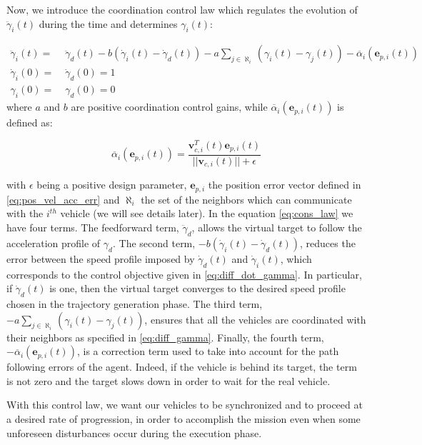 Now, we introduce the coordination control law which regulates the evolution of
$\ddot{\gamma}_i(t)$ during the time and determines $\gamma_i(t)$:

\begin{equation} \label{eq:cons_law}
  \begin{aligned}
    \ddot{\gamma}_i(t) = & \; \ddot{\gamma}_d(t) - b (\dot{\gamma}_i(t) - \dot{\gamma}_d(t)) - a \sum_{j \in \aleph_i} (\gamma_i(t) - \gamma_j(t)) - \overline{\alpha}_i (\bm{e}_{p,i}(t)) \\
    \dot{\gamma}_i(0) = & \; \dot{\gamma}_d(0) = 1 \\
    \gamma_i(0) = & \; \gamma_d(0) = 0
  \end{aligned}
\end{equation}
where $a$ and $b$ are positive coordination control gains, while $\overline{\alpha}_i (\bm{e}_{p,i}(t))$
is defined as:

\begin{equation} \label{eq:error_term}
  \overline{\alpha}_i (\bm{e}_{p,i}(t)) = \frac{\bm{v}_{c,i}^T(t) \bm{e}_{p,i}(t)}{||\bm{v}_{c,i}(t)|| + \epsilon}
\end{equation}

with $\epsilon$ being a positive design parameter, $\bm{e}_{p,i}$ the position
error vector defined in \eqref{eq:pos_vel_acc_err} and $\aleph_i$ the set of the
neighbors which can communicate with the $i^{th}$ vehicle (we will see details later).
In the equation \eqref{eq:cons_law} we have four terms. The feedforward term,
$\ddot{\gamma}_d$, allows the virtual target to follow the acceleration profile of
$\gamma_d$.
The second term, $- b (\dot{\gamma}_i(t) - \dot{\gamma}_d(t))$, reduces the error
between the speed profile imposed by $\dot{\gamma}_d(t)$ and $\dot{\gamma}_i(t)$,
which corresponds to the control objective given in \eqref{eq:diff_dot_gamma}.
In particular, if $\dot{\gamma}_d(t)$ is one, then the virtual target converges
to the desired speed profile chosen in the trajectory generation phase.
The third term, $- a \sum_{j \in \aleph_i} (\gamma_i(t) - \gamma_j(t))$, ensures that
all the vehicles are coordinated with their neighbors as specified in \eqref{eq:diff_gamma}.
Finally, the fourth term, $- \overline{\alpha}_i (\bm{e}_{p,i}(t))$, is a correction term
used to take into account for the path following errors of the agent. Indeed, if the
vehicle is behind its target, the term is not zero and the target slows down in order
to wait for the real vehicle.

With this control law, we want our vehicles to be synchronized and to proceed at
a desired rate of progression, in order to accomplish the mission even when
some unforeseen disturbances occur during the execution phase.
